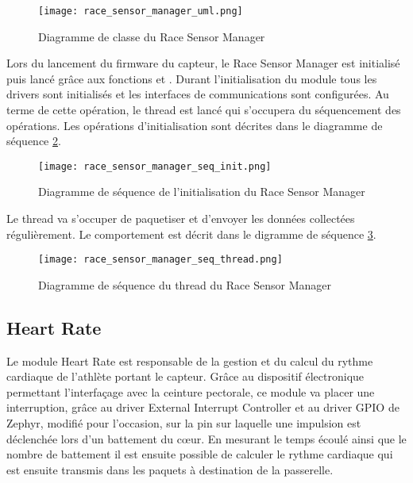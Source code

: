 \begin{figure}[htb]
\centering 
\texttt{[image: race\_sensor\_manager\_uml.png]} 
\caption{Diagramme de classe du Race Sensor Manager}
\label{fig:race_sensor_manager_uml}
\end{figure}

Lors du lancement du firmware du capteur, le Race Sensor Manager est initialisé puis lancé grâce aux fonctions  et . Durant l'initialisation du module tous les drivers sont initialisés et les interfaces de communications sont configurées. Au terme de cette opération, le thread est lancé qui s'occupera du séquencement des opérations. Les opérations d'initialisation sont décrites dans le diagramme de séquence \ref{fig:race_sensor_manager_init_seq}.

\begin{figure}[htb]
\centering 
\texttt{[image: race\_sensor\_manager\_seq\_init.png]} 
\caption{Diagramme de séquence de l'initialisation du Race Sensor Manager}
\label{fig:race_sensor_manager_init_seq}
\end{figure}

Le thread va s'occuper de paquetiser et d'envoyer les données collectées régulièrement. Le comportement est décrit dans le digramme de séquence \ref{fig:race_sensor_manager_init_thread}.

\begin{figure}[htb]
\centering 
\texttt{[image: race\_sensor\_manager\_seq\_thread.png]} 
\caption{Diagramme de séquence du thread du Race Sensor Manager}
\label{fig:race_sensor_manager_init_thread}
\end{figure}

\subsection{Heart Rate}

Le module Heart Rate est responsable de la gestion et du calcul du rythme cardiaque de l'athlète portant le capteur. Grâce au dispositif électronique permettant l'interfaçage avec la ceinture pectorale, ce module va placer une interruption, grâce au driver External Interrupt Controller et au driver GPIO de Zephyr, modifié pour l'occasion, sur la pin sur laquelle une impulsion est déclenchée lors d'un battement du cœur.  En mesurant le temps écoulé ainsi que le nombre de battement il est ensuite possible de calculer le rythme cardiaque qui est ensuite transmis dans les paquets à destination de la passerelle.

